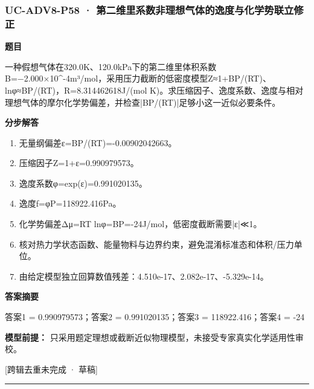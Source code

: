 \documentclass[UTF8,11pt,a4paper]{ctexart}
\begin{document}
\subsubsection*{UC-ADV8-P58 · 第二维里系数非理想气体的逸度与化学势联立修正}
\noindent\textbf{题目}\par
一种假想气体在320.0K、120.0kPa下的第二维里体积系数B=−2.000×10\textasciicircum{}-4m³/mol，采用压力截断的低密度模型Z≈1+BP/(RT)、lnφ≈BP/(RT)，R=8.314462618J/(mol K)。求压缩因子、逸度系数、逸度与相对理想气体的摩尔化学势偏差，并检查|BP/(RT)|足够小这一近似必要条件。\par
\medskip\noindent\textbf{分步解答}
\begin{enumerate}
\item 无量纲偏差ε=BP/(RT)=-0.00902042663。
\item 压缩因子Z=1+ε=0.990979573。
\item 逸度系数φ=exp(ε)=0.991020135。
\item 逸度f=φP=118922.416Pa。
\item 化学势偏差Δμ=RT lnφ=BP=-24J/mol，低密度截断需要|ε|≪1。
\item 核对热力学状态函数、能量物料与边界约束，避免混淆标准态和体积/压力单位。
\item 由给定模型独立回算数值残差：4.510e-17、2.082e-17、-5.329e-14。
\end{enumerate}
\noindent\textbf{答案摘要}\par
答案1 = 0.990979573；答案2 = 0.991020135；答案3 = 118922.416；答案4 = -24\par
\noindent\textbf{模型前提：}
只采用题定理想或截断近似物理模型，未接受专家真实化学适用性审校。\par
\noindent\textcolor{red!65!black}{[跨辑去重未完成 · 草稿]} \par
\medskip\hrule\medskip
{}
\end{document}
